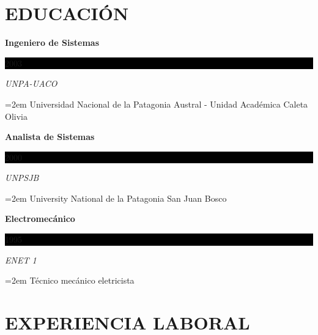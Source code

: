 \documentclass[paper=a4,fontsize=11pt]{scrartcl} %
\newcommand{\sepspace}{\vspace*{1em}}		%
\newcommand{\NewPart}[1]{\section*{\uppercase{#1}}}
\newcommand{\EducationEntry}[4]{
		\noindent \textbf{#1} \hfill      %
		\colorbox{Black}{%
			\parbox{6em}{%
			\hfill\color{White}#2}} \par  %
		\noindent \textit{#3} \par        %
		\noindent\hangindent=2em\hangafter=0 \small #4 %
		\normalsize \par}
\begin{document}
\sepspace

\NewPart{Educación}{}

\EducationEntry{Ingeniero de Sistemas}{2003}{UNPA-UACO}
{Universidad Nacional de la Patagonia Austral - Unidad Académica Caleta Olivia}
\sepspace

\EducationEntry{Analista de Sistemas}{2000}{UNPSJB}
{University National de la Patagonia San Juan Bosco}
\sepspace

\EducationEntry{Electromecánico}{1995}{ENET 1}
{Técnico mecánico eletricista}
\sepspace

\NewPart{Experiencia laboral}{}
\end{document}
